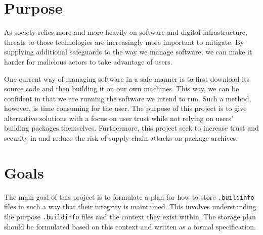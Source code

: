 \documentclass[english, biblatex, digitaloutput]{kththesis}
\begin{document}
\section{Purpose}


As society relies more and more heavily on software and digital infrastructure, threats to those technologies are increasingly more important to mitigate. By supplying additional safeguards to the way we manage software, we can make it harder for malicious actors to take advantage of users.

One current way of managing software in a safe manner is to first download its source code and then building it on our own machines. This way, we can be confident in that we are running the software we intend to run. Such a method, however, is time consuming for the user. The purpose of this project is to give alternative solutions with a focus on user trust while not relying on users' building packages themselves. Furthermore, this project seek to increase trust and security in  and reduce the risk of supply-chain attacks on package archives.


\section{Goals}

The main goal of this project is to formulate a plan for how to store \texttt{.buildinfo} files in such a way that their integrity is maintained. This involves understanding the purpose \texttt{.buildinfo} files and the context they exist within. The storage plan should be formulated based on this context and written as a formal specification.
\end{document}
